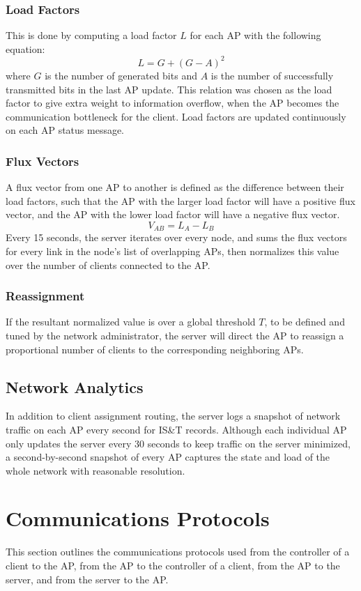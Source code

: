 \documentclass[10pt,journal,compsoc]{IEEEtran}
\begin{document}
		\subsubsection{Load Factors}
		This is done by computing a load factor \(L\) for each AP with the following equation:
		\[L = G + (G-A)^2\]
		where \(G\) is the number of generated bits and \(A\) is the number of successfully transmitted bits in the last AP update. This relation was chosen as the load factor to give extra weight to information overflow, when the AP becomes the communication bottleneck for the client. Load factors are updated continuously on each AP status message.
		
		\subsubsection{Flux Vectors}
		A flux vector from one AP to another is defined as the difference between their load factors, such that the AP with the larger load factor will have a positive flux vector, and the AP with the lower load factor will have a negative flux vector.
		\[V_{AB} = L_A - L_B\]
		Every 15 seconds, the server iterates over every node, and sums the flux vectors for every link in the node's list of overlapping APs, then normalizes this value over the number of clients connected to the AP. 
		
		\subsubsection{Reassignment}
		If the resultant normalized value is over a global threshold \(T\), to be defined and tuned by the network administrator, the server will direct the AP to reassign a proportional number of clients to the corresponding neighboring APs.
		
		\subsection{Network Analytics}
		In addition to client assignment routing, the server logs a snapshot of network traffic on each AP every second for IS\&T records. Although each individual AP only updates the server every 30 seconds to keep traffic on the server minimized, a second-by-second snapshot of every AP captures the state and load of the whole network with reasonable resolution.
		
		\section{Communications Protocols}
		This section outlines the communications protocols used from the controller of a client to the AP, from the AP to the controller of a client, from the AP to the server, and from the server to the AP.
		
\end{document}
